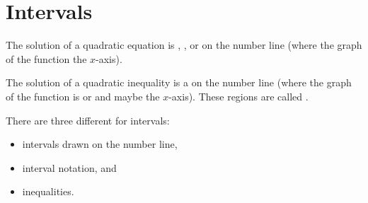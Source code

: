 \section{Intervals}

The solution of a quadratic equation is , , or   on the number line
(where the graph of the function  the $x$-axis).

The solution of a quadratic inequality is a  on the number line
(where the graph of the function is  or  and maybe  the $x$-axis).
These regions are called .

There are three different  for intervals:
\begin{itemize}[nosep]
    \item intervals drawn on the number line,
    \item interval notation, and 
    \item inequalities.
\end{itemize}

